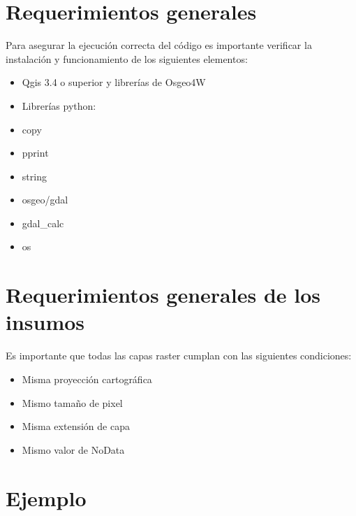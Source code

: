 \documentclass[letterpaper,10pt,spanish]{sphinxmanual}
\begin{document}
\section{Requerimientos generales}
\label{\detokenize{analisis:requerimientos-generales}}
Para asegurar la ejecución correcta del código es importante
verificar la instalación y funcionamiento de los siguientes elementos:
\begin{itemize}
\item {} 
Qgis 3.4 o superior y librerías de Osgeo4W

\item {} 
Librerías python:

\end{itemize}
\begin{itemize}
\item {} 
copy

\item {} 
pprint

\item {} 
string

\item {} 
osgeo/gdal

\item {} 
gdal\_calc

\item {} 
os

\end{itemize}


\section{Requerimientos generales de los insumos}
\label{\detokenize{analisis:requerimientos-generales-de-los-insumos}}
Es importante que todas las capas raster cumplan con las siguientes condiciones:
\begin{itemize}
\item {} 
Misma proyección cartográfica

\item {} 
Mismo tamaño de pixel

\item {} 
Misma extensión de capa

\item {} 
Mismo valor de NoData

\end{itemize}


\section{Ejemplo}
\label{\detokenize{analisis:ejemplo}}
\end{document}
